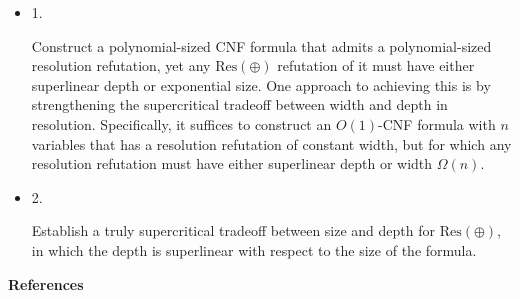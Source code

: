 \documentclass[10pt,a4paper]{article}
\begin{document}
\begin{itemize}


\item 
1. 


Construct a polynomial-sized CNF formula that admits a polynomial-sized resolution
refutation, yet any $\mathrm{Res}(\oplus)$ refutation of it must have either superlinear depth or exponential size.
One approach to achieving this is by strengthening the supercritical tradeoff
between width and depth in resolution. Specifically, it suffices to construct an $O(1)$-CNF
formula with $n$ variables that has a resolution refutation of constant width,
but for which any resolution refutation must have either superlinear depth or width $\Omega(n)$.\par





\item 
2. 


Establish a truly supercritical tradeoff between size and depth for $\mathrm{Res}(\oplus)$,
in which the depth is superlinear with respect to the size of the formula.\par





\end{itemize}


\par\medskip\noindent\textbf{References}\par
\end{document}
